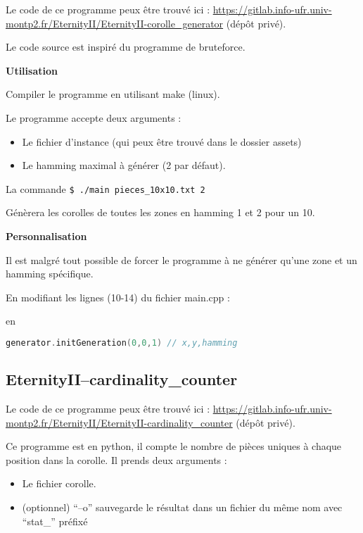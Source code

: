 	Le code de ce programme peux être trouvé ici : \url{https://gitlab.info-ufr.univ-montp2.fr/EternityII/EternityII-corolle_generator} (dépôt privé).
	
	Le code source est inspiré du programme de bruteforce.
	
	\textbf{Utilisation}
	
	Compiler le programme en utilisant make (linux).
	
	Le programme accepte deux arguments :
	
	\begin{itemize}
		\item Le fichier d'instance (qui peux être trouvé dans le dossier assets)
		\item Le hamming maximal à générer (2 par défaut).
	\end{itemize}
	
	\begin{exmp}
		La commande \lstinline[language=bash]|$ ./main pieces_10x10.txt 2|
		
		Génèrera les corolles de toutes les zones en hamming 1 et 2 pour un 10.
	\end{exmp}
	
	\textbf{Personnalisation}
	
	Il est malgré tout possible de forcer le programme à ne générer qu'une zone et un hamming spécifique.
	
	En modifiant les lignes (10-14) du fichier main.cpp :
	
	
	
	en 
	
	\begin{lstlisting}[language=c++]
generator.initGeneration(0,0,1) // x,y,hamming
	\end{lstlisting}
	
	\subsection{EternityII--cardinality\_counter} 
	
	Le code de ce programme peux être trouvé ici : \url{https://gitlab.info-ufr.univ-montp2.fr/EternityII/EternityII-cardinality_counter} (dépôt privé).
	
	Ce programme est en python, il compte le nombre de pièces uniques à chaque position dans la corolle. Il prends deux arguments :
	
	\begin{itemize}
		\item Le fichier corolle.
		\item (optionnel) \enquote{--o} sauvegarde le résultat dans un fichier du même nom avec \enquote{stat\_} préfixé
	\end{itemize}
	
